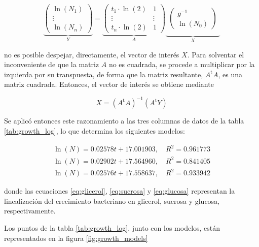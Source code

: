 \[
  \underbrace{
  \left(
    \begin{array}{c}
      \ln(N_1) \\
      \vdots \\
      \ln(N_n)
    \end{array}
  \right)
  }_{\displaystyle Y}
  = 
  \underbrace{
  \left(
    \begin{array}{cc}
      t_1\cdot\ln(2) & 1 \\
      \vdots & \vdots \\
      t_n\cdot\ln(2) & 1
    \end{array}
  \right)}_{\displaystyle A}
  \underbrace{
    \begin{array}{c}
    \\[-4pt]
    \left(
      \begin{array}{c}
        g^{-1} \\
        \ln(N_0)
      \end{array}
    \right) \\[18pt]
  \end{array}}_{\displaystyle X}
\]

no es posible despejar, directamente, el vector de interés $X$. Para solventar el inconveniente de que la matriz $A$ no es cuadrada, se procede a multiplicar por la izquierda por su transpuesta, de forma que la matriz resultante, $A^{\text{t}}A$, es una matriz cuadrada. Entonces, el vector de interés se obtiene mediante

\begin{equation}
  X = (A^{\text{t}}A)^{-1}(A^{\text{t}}Y)
\end{equation}

Se aplicó entonces este razonamiento a las tres columnas de datos de la tabla \ref{tab:growth_log}, lo que determina los siguientes modelos: 

\begin{eqnarray}
  \ln(N) = 0.02578 t + 17.001903, \quad R^2=0.961773 \label{eq:glicerol} \\
  \ln(N) = 0.02902 t + 17.564960, \quad R^2=0.841405 \label{eq:sucrosa} \\
  \ln(N) = 0.02576 t + 17.558637, \quad R^2=0.933942 \label{eq:glucosa}
\end{eqnarray}

donde las ecuaciones \eqref{eq:glicerol}, \eqref{eq:sucrosa} y \eqref{eq:glucosa} representan la linealización del crecimiento bacteriano en glicerol, sucrosa y glucosa, respectivamente.

Los puntos de la tabla \ref{tab:growth_log}, junto con los modelos, están representados en la figura \ref{fig:growth_models}

